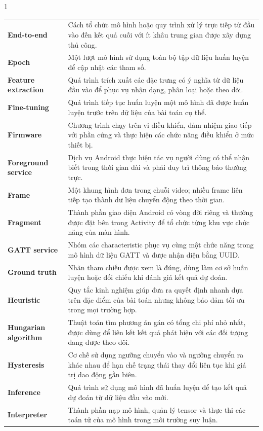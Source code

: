 \begin{spacing}{1}
\begin{longtable}{@{}>{\bfseries\color{HCMUTDarkBlue}}p{4.1cm}p{10.7cm}@{}}
  End-to-end
    & Cách tổ chức mô hình hoặc quy trình xử lý trực tiếp từ đầu vào đến kết quả cuối với ít khâu trung gian được xây dựng thủ công. \\
  Epoch
    & Một lượt mô hình sử dụng toàn bộ tập dữ liệu huấn luyện để cập nhật các tham số. \\
  Feature extraction
    & Quá trình trích xuất các đặc trưng có ý nghĩa từ dữ liệu đầu vào để phục vụ nhận dạng, phân loại hoặc theo dõi. \\
  Fine-tuning
    & Quá trình tiếp tục huấn luyện một mô hình đã được huấn luyện trước trên dữ liệu của bài toán cụ thể. \\
  Firmware
    & Chương trình chạy trên vi điều khiển, đảm nhiệm giao tiếp với phần cứng và thực hiện các chức năng điều khiển ở mức thiết bị. \\
  Foreground service
    & Dịch vụ Android thực hiện tác vụ người dùng có thể nhận biết trong thời gian dài và phải duy trì thông báo thường trực. \\
  Frame
    & Một khung hình đơn trong chuỗi video; nhiều frame liên tiếp tạo thành dữ liệu chuyển động theo thời gian. \\
  Fragment
    & Thành phần giao diện Android có vòng đời riêng và thường được đặt bên trong Activity để tổ chức từng khu vực chức năng của màn hình. \\
  GATT service
    & Nhóm các characteristic phục vụ cùng một chức năng trong mô hình dữ liệu GATT và được nhận diện bằng UUID. \\
  Ground truth
    & Nhãn tham chiếu được xem là đúng, dùng làm cơ sở huấn luyện hoặc đối chiếu khi đánh giá kết quả dự đoán. \\
  Heuristic
    & Quy tắc kinh nghiệm giúp đưa ra quyết định nhanh dựa trên đặc điểm của bài toán nhưng không bảo đảm tối ưu trong mọi trường hợp. \\
  Hungarian algorithm
    & Thuật toán tìm phương án gán có tổng chi phí nhỏ nhất, được dùng để liên kết kết quả phát hiện với các đối tượng đang được theo dõi. \\
  Hysteresis
    & Cơ chế sử dụng ngưỡng chuyển vào và ngưỡng chuyển ra khác nhau để hạn chế trạng thái thay đổi liên tục khi giá trị dao động gần biên. \\
  Inference
    & Quá trình sử dụng mô hình đã huấn luyện để tạo kết quả dự đoán từ dữ liệu đầu vào mới. \\
  Interpreter
    & Thành phần nạp mô hình, quản lý tensor và thực thi các toán tử của mô hình trong môi trường suy luận. \\

\end{longtable}
\end{spacing}
